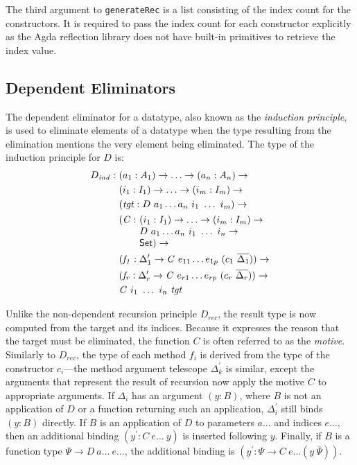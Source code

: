 \documentclass[sigplan,10pt]{acmart}
\begin{document}
The third argument to {\tt generateRec} is a list consisting of the index count for the constructors. It is required to pass the index count for each constructor explicitly as the Agda reflection library does not have built-in primitives to retrieve the index value.

\subsection{Dependent Eliminators}
\label{sec:sec3.2}

The dependent eliminator for a datatype, also known as the \emph{induction principle}, is used to eliminate elements of a datatype when the type resulting from the elimination mentions the very element being eliminated. The type of the induction principle for $D$ is:
\begin{align*}
D_{\mathit{ind}} :\ & (a_1 : A_1) \to \ldots \to (a_n : A_n) \to\\
& (i_1 : I_1) \to \ldots \to (i_m : I_m) \to\\
& (\mathit{tgt} : D\ a_1 \ldots a_n\ i_1\ \ldots\ i_m) \to\\
& \begin{array}{@{}l@{}l}(\mathit{C} :\ & (i_1 : I_1) \to \ldots \to (i_m : I_m) \to\\  & D\ a_1 \ldots a_n\ i_1\ \ldots\ i_n \to\\ &\SET{})\to\end{array} \\
& (\mathit{f_1} : \Delta_1^\prime \to \mathit{C}\ e_{11} \ldots e_{1p}\ (c_1\ \overline{\Delta_1})) \to \\
& (\mathit{f_r} : \Delta_r^\prime \to \mathit{C}\ e_{r1} \ldots e_{rp}\ (c_r\ \overline{\Delta_r})) \to \\
& \mathit{C}\ i_1\ \ldots\ i_n\ \mathit{tgt}
\end{align*}

Unlike the non-dependent recursion principle $D_{\mathit{rec}}$, the result type is now computed from the target and its indices.
Because it expresses the reason that the target must be eliminated, the function $C$ is often referred to as the \emph{motive}.
Similarly to  $D_{\mathit{rec}}$, the type of each method $f_i$ is derived from the type of the constructor $c_i$---the method argument telescope $\Delta_k^\prime$ is similar, except the arguments that represent the result of recursion now apply the motive $C$ to appropriate arguments.
If $\Delta_i$ has an argument $(y : B)$, where $B$ is not an application of $D$ or a function returning such an application, $\Delta_i^\prime$ still binds $(y : B)$ directly.
If $B$ is an application of $D$ to parameters $a\ldots$ and indices $e\ldots$, then an additional binding $(y^\prime : C\ e\ldots\ y)$ is inserted following $y$.
Finally, if $B$ is a function type $\Psi \to D\ a\ldots\ e\ldots$, the additional binding is $(y^\prime : \Psi \to C\ e\ldots (y\ \overline{\Psi}))$. 
\end{document}
